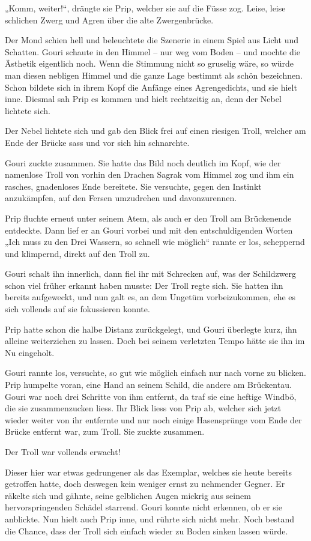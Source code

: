 \documentclass[10pt, a4paper, oneside]{book}
\begin{document}
„Komm, weiter!“, drängte sie Prip, welcher sie auf die Füsse zog. Leise, leise schlichen Zwerg und Agren über die alte Zwergenbrücke.

Der Mond schien hell und beleuchtete die Szenerie in einem Spiel aus Licht und Schatten. Gouri schaute in den Himmel – nur weg vom Boden – und mochte die Ästhetik eigentlich noch. Wenn die Stimmung nicht so gruselig wäre, so würde man diesen nebligen Himmel und die ganze Lage bestimmt als schön bezeichnen. Schon bildete sich in ihrem Kopf die Anfänge eines Agrengedichts, und sie hielt inne. Diesmal sah Prip es kommen und hielt rechtzeitig an, denn der Nebel lichtete sich.

Der Nebel lichtete sich und gab den Blick frei auf einen riesigen Troll, welcher am Ende der Brücke sass und vor sich hin schnarchte.

Gouri zuckte zusammen. Sie hatte das Bild noch deutlich im Kopf, wie der namenlose Troll von vorhin den Drachen Sagrak vom Himmel zog und ihm ein rasches, gnadenloses Ende bereitete. Sie versuchte, gegen den Instinkt anzukämpfen, auf den Fersen umzudrehen und davonzurennen.

Prip fluchte erneut unter seinem Atem, als auch er den Troll am Brückenende entdeckte. Dann lief er an Gouri vorbei und mit den entschuldigenden Worten „Ich muss zu den Drei Wassern, so schnell wie möglich“ rannte er los, scheppernd und klimpernd, direkt auf den Troll zu.

Gouri schalt ihn innerlich, dann fiel ihr mit Schrecken auf, was der Schildzwerg schon viel früher erkannt haben musste: Der Troll regte sich. Sie hatten ihn bereits aufgeweckt, und nun galt es, an dem Ungetüm vorbeizukommen, ehe es sich vollends auf sie fokussieren konnte.

Prip hatte schon die halbe Distanz zurückgelegt, und Gouri überlegte kurz, ihn alleine weiterziehen zu lassen. Doch bei seinem verletzten Tempo hätte sie ihn im Nu eingeholt.

Gouri rannte los, versuchte, so gut wie möglich einfach nur nach vorne zu blicken. Prip humpelte voran, eine Hand an seinem Schild, die andere am Brückentau. Gouri war noch drei Schritte von ihm entfernt, da traf sie eine heftige Windbö, die sie zusammenzucken liess. Ihr Blick liess von Prip ab, welcher sich jetzt wieder weiter von ihr entfernte und nur noch einige Hasensprünge vom Ende der Brücke entfernt war, zum Troll. Sie zuckte zusammen.

Der Troll war vollends erwacht!

Dieser hier war etwas gedrungener als das Exemplar, welches sie heute bereits getroffen hatte, doch deswegen kein weniger ernst zu nehmender Gegner. Er räkelte sich und gähnte, seine gelblichen Augen mickrig aus seinem hervorspringenden Schädel starrend. Gouri konnte nicht erkennen, ob er sie anblickte. Nun hielt auch Prip inne, und rührte sich nicht mehr. Noch bestand die Chance, dass der Troll sich einfach wieder zu Boden sinken lassen würde.
\end{document}
